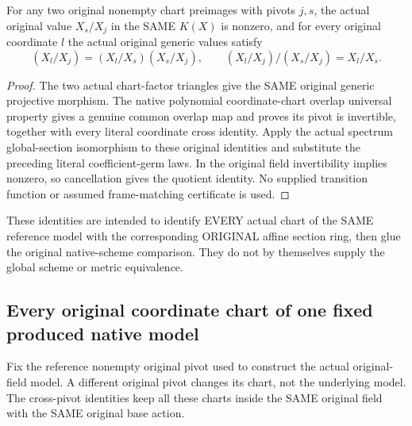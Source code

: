 \begin{theorem}
\label{thm:seven-original-projective-generic-pivot-transitions-route}
\leanok
{}
For any two original nonempty chart preimages with pivots $j,s$,
the actual original value $X_s/X_j$ in the SAME $K(X)$ is nonzero, and
for every original coordinate $l$ the actual original generic values
satisfy
\[
 (X_l/X_j)=(X_l/X_s)(X_s/X_j),\qquad
 (X_l/X_j)/(X_s/X_j)=X_l/X_s.
\]
\end{theorem}
\begin{proof}
The two actual chart-factor triangles give the SAME original generic
projective morphism. The native polynomial coordinate-chart overlap
universal property gives a genuine common overlap map and proves its
pivot is invertible, together with every literal coordinate cross
identity. Apply the actual spectrum global-section isomorphism to
these original identities and substitute the preceding literal
coefficient-germ laws. In the original field invertibility implies
nonzero, so cancellation gives the quotient identity. No supplied
transition function or assumed frame-matching certificate is used.
\end{proof}

These identities are intended to identify EVERY actual chart of the
SAME reference model with the corresponding ORIGINAL affine section
ring, then glue the original native-scheme comparison. They do not
by themselves supply the global scheme or metric equivalence.

\subsection{Every original coordinate chart of one fixed produced native model}
Fix the reference nonempty original pivot used to construct the actual
original-field model. A different original pivot changes its chart,
not the underlying model. The cross-pivot identities keep all these
charts inside the SAME original field with the SAME original base action.

